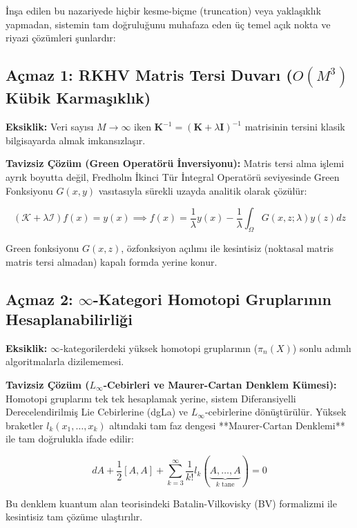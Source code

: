 \documentclass[11pt, a4paper]{article}
\begin{document}
İnşa edilen bu nazariyede hiçbir kesme-biçme (truncation) veya yaklaşıklık yapmadan, sistemin tam doğruluğunu muhafaza eden üç temel açık nokta ve riyazi çözümleri şunlardır:

\subsection{Açmaz 1: RKHV Matris Tersi Duvarı ($O(M^3)$ Kübik Karmaşıklık)}
\textbf{Eksiklik:} Veri sayısı $M \to \infty$ iken $\mathbf{K}^{-1} = (\mathbf{K} + \lambda \mathbf{I})^{-1}$ matrisinin tersini klasik bilgisayarda almak imkansızlaşır.

\textbf{Tavizsiz Çözüm (Green Operatörü İnversiyonu):} Matris tersi alma işlemi ayrık boyutta değil, Fredholm İkinci Tür İntegral Operatörü seviyesinde Green Fonksiyonu $G(x, y)$ vasıtasıyla sürekli uzayda analitik olarak çözülür:

\begin{equation}
(\mathcal{K} + \lambda \mathcal{I}) f(x) = y(x) \implies f(x) = \frac{1}{\lambda} y(x) - \frac{1}{\lambda} \int_\Omega G(x, z; \lambda) y(z) dz
\end{equation}

Green fonksiyonu $G(x, z)$, özfonksiyon açılımı ile kesintisiz (noktasal matris matris tersi almadan) kapalı formda yerine konur.

\subsection{Açmaz 2: $\infty$-Kategori Homotopi Gruplarının Hesaplanabilirliği}
\textbf{Eksiklik:} $\infty$-kategorilerdeki yüksek homotopi gruplarının ($\pi_n(X)$) sonlu adımlı algoritmalarla dizilememesi.

\textbf{Tavizsiz Çözüm ($L_\infty$-Cebirleri ve Maurer-Cartan Denklem Kümesi):} Homotopi gruplarını tek tek hesaplamak yerine, sistem Diferansiyelli Derecelendirilmiş Lie Cebirlerine (dgLa) ve $L_\infty$-cebirlerine dönüştürülür. Yüksek braketler $l_k(x_1, \dots, x_k)$ altındaki tam faz dengesi **Maurer-Cartan Denklemi** ile tam doğrulukla ifade edilir:

\begin{equation}
d A + \frac{1}{2} [A, A] + \sum_{k=3}^\infty \frac{1}{k!} l_k(\underbrace{A, \dots, A}_{k \text{ tane}}) = 0
\end{equation}

Bu denklem kuantum alan teorisindeki Batalin-Vilkovisky (BV) formalizmi ile kesintisiz tam çözüme ulaştırılır.
\end{document}

